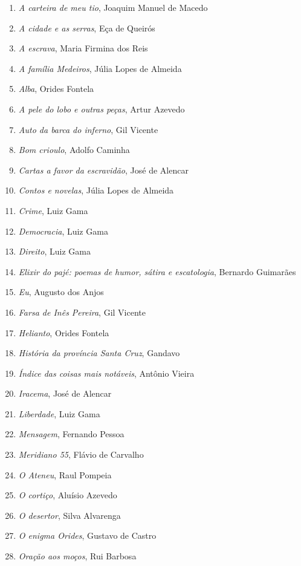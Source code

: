 \begin{enumerate}
\setlength{\topsep}{2pt}
\setlength{\partopsep}{0pt}
\setlength\parskip{4.2pt}
\setlength\itemsep{-1.4mm}
\item \textit{A carteira de meu tio}, Joaquim Manuel de Macedo
\item \textit{A cidade e as serras}, Eça de Queirós
\item \textit{A escrava}, Maria Firmina dos Reis
\item \textit{A família Medeiros}, Júlia Lopes de Almeida
\item \textit{Alba}, Orides Fontela
\item \textit{A pele do lobo e outras peças}, Artur Azevedo
\item \textit{Auto da barca do inferno}, Gil Vicente
\item \textit{Bom crioulo}, Adolfo Caminha
\item \textit{Cartas a favor da escravidão}, José de Alencar
\item \textit{Contos e novelas}, Júlia Lopes de Almeida
\item \textit{Crime}, Luiz Gama
\item \textit{Democracia}, Luiz Gama
\item \textit{Direito}, Luiz Gama
\item \textit{Elixir do pajé: poemas de humor, sátira e escatologia}, Bernardo Guimarães
\item \textit{Eu}, Augusto dos Anjos
\item \textit{Farsa de Inês Pereira}, Gil Vicente
\item \textit{Helianto}, Orides Fontela
\item \textit{História da província Santa Cruz}, Gandavo
\item \textit{Índice das coisas mais notáveis}, Antônio Vieira
\item \textit{Iracema}, José de Alencar
\item \textit{Liberdade}, Luiz Gama
\item \textit{Mensagem}, Fernando Pessoa
\item \textit{Meridiano 55}, Flávio de Carvalho
\item \textit{O Ateneu}, Raul Pompeia
\item \textit{O cortiço}, Aluísio Azevedo
\item \textit{O desertor}, Silva Alvarenga
\item \textit{O enigma Orides}, Gustavo de Castro
\item \textit{Oração aos moços}, Rui Barbosa

\end{enumerate}
